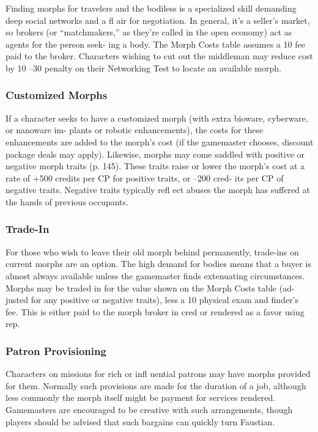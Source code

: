 Finding morphs for travelers and the bodiless is a 
specialized skill demanding deep social networks and 
a fl air for negotiation. In general, it's a seller's market, 
so brokers (or ``matchmakers,'' as they're called in 
the open economy) act as agents for the person seek-
ing a body. The Morph Costs table assumes a 10%
fee paid to the broker. Characters wishing to cut out 
the middleman may reduce cost by 10%
–30 penalty on their Networking Test to locate an 
available morph.

\subsubsection{Customized Morphs}

If a character seeks to have a customized morph 
(with extra bioware, cyberware, or nanoware im-
plants or robotic enhancements), the costs for these 
enhancements are added to the morph's cost (if the 
gamemaster chooses, discount package deals may 
apply). Likewise, morphs may come saddled with 
positive or negative morph traits (p. 145). These 
traits raise or lower the morph's cost at a rate of 
+500 credits per CP for positive traits, or –200 cred-
its per CP of negative traits. Negative traits typically 
refl ect abuses the morph has suffered at the hands of 
previous occupants.

\subsubsection{Trade-In}

For those who wish to leave their old morph behind 
permanently, trade-ins on current morphs are an 
option. The high demand for bodies means that a buyer 
is almost always available unless the gamemaster finds 
extenuating circumstances. Morphs may be traded in 
for the value shown on the Morph Costs table (ad-
justed for any positive or negative traits), less a 10%
physical exam and finder's fee. This is either paid to the 
morph broker in cred or rendered as a favor using rep.

\subsubsection{Patron Provisioning}

Characters on missions for rich or infl uential patrons 
may have morphs provided for them. Normally 
such provisions are made for the duration of a job, 
although less commonly the morph itself might be 
payment for services rendered. Gamemasters are 
encouraged to be creative with such arrangements, 
though players should be advised that such bargains 
can quickly turn Faustian.

